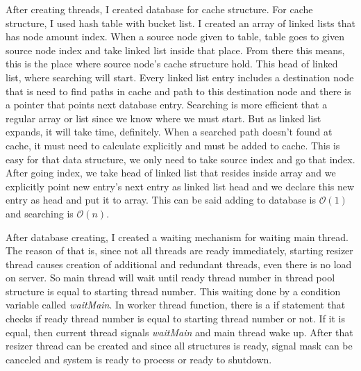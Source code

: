 \documentclass[letterpaper, 10 pt, conference]{ieeeconf}  %
\begin{document}
After creating threads, I created database for cache structure. For cache structure, I used hash table with bucket list. I created an array of linked lists that has node amount index. When a source node given to table, table goes to given source node index and take linked list inside that place. From there this means, this is the place where source node's cache structure hold. This head of linked list, where searching will start. Every linked list entry includes a destination node that is need to find paths in cache and path to this destination node and there is a pointer that points next database entry. Searching is more efficient that a regular array or list since we know where we must start. But as linked list expands, it will take time, definitely. When a searched path doesn't found at cache, it must need to calculate explicitly and must be added to cache. This is easy for that data structure, we only need to take source index and go that index. After going index, we take head of linked list that resides inside array and we explicitly point new entry's next entry as linked list head and we declare this new entry as head and put it to array. This can be said adding to database is $\mathcal{O}(1)$ and searching is $\mathcal{O}(n)$.

After database creating, I created a waiting mechanism for waiting main thread. The reason of that is, since not all threads are ready immediately, starting resizer thread causes creation of additional and redundant threads, even there is no load on server. So main thread will wait until ready thread number in thread pool structure is equal to starting thread number. This waiting done by a condition variable called \textit{waitMain}. In worker thread function, there is a if statement that checks if ready thread number is equal to starting thread number or not. If it is equal, then current thread signals \textit{waitMain} and main thread wake up. After that resizer thread can be created and since all structures is ready, signal mask can be canceled and system is ready to process or ready to shutdown.
\end{document}
